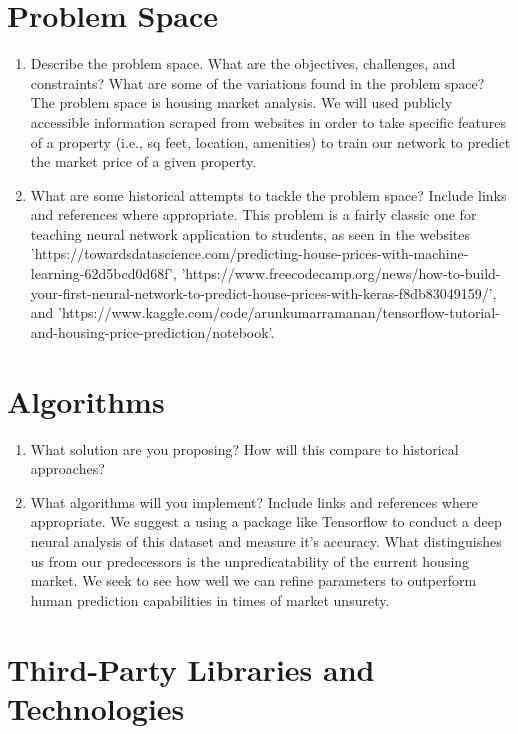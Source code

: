 \documentclass[]{article}
\begin{document}
\section{Problem Space}
\begin{enumerate}
	\item Describe the problem space. What are the objectives, challenges, and constraints? What are some of the variations found in the problem space?
	\vspace{0.5cm}
	The problem space is housing market analysis.  We will used publicly accessible information scraped from websites in order to take specific features of a property (i.e., sq feet, location, amenities) to train our network to predict the market price of a given property.

	\item What are some historical attempts to tackle the problem space? Include links and references where appropriate.
	\vspace{0.5cm}
	This problem is a fairly classic one for teaching neural network application to students, as seen in the websites 'https://towardsdatascience.com/predicting-house-prices-with-machine-learning-62d5bcd0d68f', 'https://www.freecodecamp.org/news/how-to-build-your-first-neural-network-to-predict-house-prices-with-keras-f8db83049159/', and 'https://www.kaggle.com/code/arunkumarramanan/tensorflow-tutorial-and-housing-price-prediction/notebook'.
\end{enumerate}

\section{Algorithms}
\begin{enumerate}
    \item What solution are you proposing? How will this compare to historical approaches? \item What algorithms will you implement? Include links and references where appropriate.
    \vspace{0.5cm}
     We suggest a  using a package like Tensorflow to conduct a deep neural analysis of this dataset and measure it's accuracy. What distinguishes us from our predecessors is the unpredicatability of the current housing market.  We seek to see how well we can refine parameters to outperform human prediction capabilities in times of market unsurety.
\end{enumerate}

\section{Third-Party Libraries and Technologies}
\end{document}
